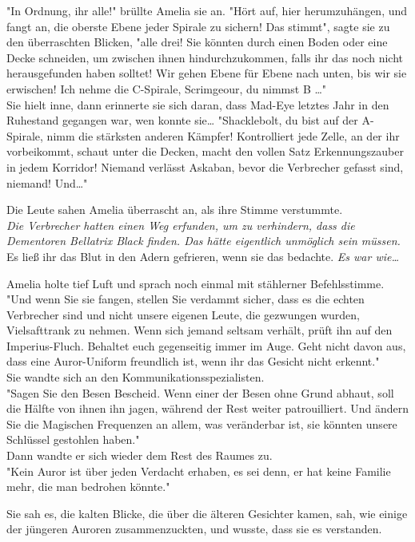 {"In Ordnung, ihr alle!" brüllte Amelia sie an. "Hört auf, hier herumzuhängen, und fangt an, die oberste Ebene jeder Spirale zu sichern! Das stimmt", sagte sie zu den überraschten Blicken, "alle drei! Sie könnten durch einen Boden oder eine Decke schneiden, um zwischen ihnen hindurchzukommen, falls ihr das noch nicht herausgefunden haben solltet! Wir gehen Ebene für Ebene nach unten, bis wir sie erwischen! Ich nehme die C-Spirale, Scrimgeour, du nimmst B …"\\ Sie hielt inne, dann erinnerte sie sich daran, dass Mad-Eye letztes Jahr in den Ruhestand gegangen war, wen konnte sie… "Shacklebolt, du bist auf der A-Spirale, nimm die stärksten anderen Kämpfer! Kontrolliert jede Zelle, an der ihr vorbeikommt, schaut unter die Decken, macht den vollen Satz Erkennungszauber in jedem Korridor! Niemand verlässt Askaban, bevor die Verbrecher gefasst sind, niemand! Und…"

Die Leute sahen Amelia überrascht an, als ihre Stimme verstummte.\\ \emph{Die Verbrecher hatten einen Weg erfunden, um zu verhindern, dass die Dementoren Bellatrix Black finden. Das hätte eigentlich unmöglich sein müssen.} Es ließ ihr das Blut in den Adern gefrieren, wenn sie das bedachte. \emph{Es war wie…}

Amelia holte tief Luft und sprach noch einmal mit stählerner Befehlsstimme.\\ "Und wenn Sie sie fangen, stellen Sie verdammt sicher, dass es die echten Verbrecher sind und nicht unsere eigenen Leute, die gezwungen wurden, Vielsafttrank zu nehmen. Wenn sich jemand seltsam verhält, prüft ihn auf den Imperius-Fluch. Behaltet euch gegenseitig immer im Auge. Geht nicht davon aus, dass eine Auror-Uniform freundlich ist, wenn ihr das Gesicht nicht erkennt."\\ Sie wandte sich an den Kommunikationsspezialisten.\\ "Sagen Sie den Besen Bescheid. Wenn einer der Besen ohne Grund abhaut, soll die Hälfte von ihnen ihn jagen, während der Rest weiter patrouilliert. Und ändern Sie die Magischen Frequenzen an allem, was veränderbar ist, sie könnten unsere Schlüssel gestohlen haben."\\ Dann wandte er sich wieder dem Rest des Raumes zu.\\ "Kein Auror ist über jeden Verdacht erhaben, es sei denn, er hat keine Familie mehr, die man bedrohen könnte."

Sie sah es, die kalten Blicke, die über die älteren Gesichter kamen, sah, wie einige der jüngeren Auroren zusammenzuckten, und wusste, dass sie es verstanden.

}
